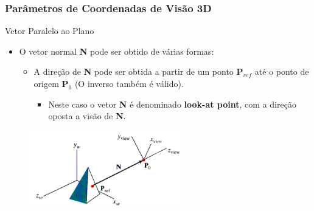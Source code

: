 \documentclass{beamer}
\begin{document}
\begin{frame}
\frametitle{Parâmetros de Coordenadas de Visão 3D}
	\begin{block}{Vetor Paralelo ao Plano}
		\begin{itemize}
			\item O vetor normal \textbf{N} pode ser obtido de várias formas:
				\begin{itemize}
					\item A direção de \textbf{N} pode ser obtida a partir de um ponto $\textbf{P}_{ref}$ até o ponto de origem $\textbf{P}_0$ (O inverso também é válido).
					\begin{itemize}
						\item Neste caso o vetor \textbf{N} é denominado \textbf{look-at point}, com a direção oposta a visão de \textbf{N}.
					\end{itemize}
				\end{itemize}
		\end{itemize}
	\end{block}
	
	\begin{figure}[!h]
			\begin{center}
			\includegraphics[width=0.6\textwidth]{Figures/VecN}
			\end{center}
	\end{figure}
\end{frame}
\end{document}
